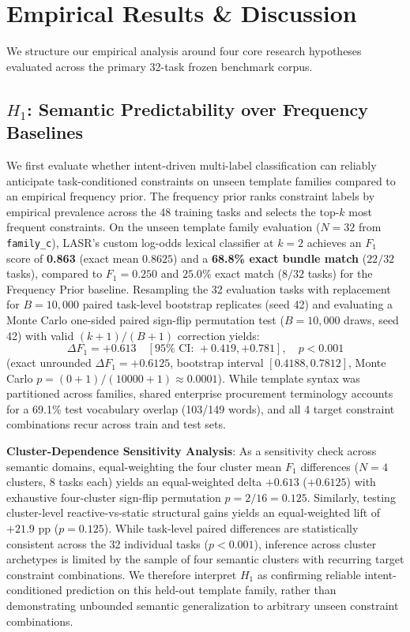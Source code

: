 \section{Empirical Results \texorpdfstring{\&}{and} Discussion}
\label{sec:results}

We structure our empirical analysis around four core research hypotheses evaluated across the primary 32-task frozen benchmark corpus.

\subsection{$H_1$: Semantic Predictability over Frequency Baselines}
We first evaluate whether intent-driven multi-label classification can reliably anticipate task-conditioned constraints on unseen template families compared to an empirical frequency prior. The frequency prior ranks constraint labels by empirical prevalence across the 48 training tasks and selects the top-$k$ most frequent constraints.
On the unseen template family evaluation ($N=32$ from \texttt{family\_c}), LASR's custom log-odds lexical classifier at $k=2$ achieves an $F_1$ score of \textbf{0.863} (exact mean $0.8625$) and a \textbf{68.8\% exact bundle match} ($22/32$ tasks), compared to \textbf{$F_1 = 0.250$} and $25.0\%$ exact match ($8/32$ tasks) for the Frequency Prior baseline. Resampling the 32 evaluation tasks with replacement for $B=10,000$ paired task-level bootstrap replicates (seed 42) and evaluating a Monte Carlo one-sided paired sign-flip permutation test ($B=10,000$ draws, seed 42) with valid $(k+1)/(B+1)$ correction yields:
\begin{equation}
\Delta F_1 = \mathbf{+0.613} \quad [95\% \text{ CI: } +0.419, +0.781], \quad p < 0.001
\end{equation}
(exact unrounded $\Delta F_1 = +0.6125$, bootstrap interval $[0.4188, 0.7812]$, Monte Carlo $p = (0+1)/(10000+1) \approx 0.0001$). While template syntax was partitioned across families, shared enterprise procurement terminology accounts for a 69.1\% test vocabulary overlap (103/149 words), and all 4 target constraint combinations recur across train and test sets.

\noindent\textbf{Cluster-Dependence Sensitivity Analysis}: As a sensitivity check across semantic domains, equal-weighting the four cluster mean $F_1$ differences ($N=4$ clusters, 8 tasks each) yields an equal-weighted delta $+0.613$ ($+0.6125$) with exhaustive four-cluster sign-flip permutation $p = 2/16 = 0.125$. Similarly, testing cluster-level reactive-vs-static structural gains yields an equal-weighted lift of $+21.9\text{ pp}$ ($p = 0.125$). While task-level paired differences are statistically consistent across the 32 individual tasks ($p < 0.001$), inference across cluster archetypes is limited by the sample of four semantic clusters with recurring target constraint combinations. We therefore interpret $H_1$ as confirming reliable intent-conditioned prediction on this held-out template family, rather than demonstrating unbounded semantic generalization to arbitrary unseen constraint combinations.

